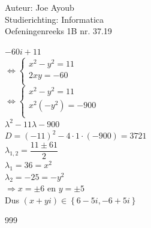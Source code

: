 \documentclass[a4paper]{article}
\newcommand{\lmb}{\lambda}
\begin{document}
  
\noindent \large Auteur: Joe Ayoub \\
\noindent \large Studierichting: Informatica\\
\noindent \large Oefeningenreeks 1B nr. 37.19\\

\medskip

\normalsize

$-60i + 11$\\

$\Leftrightarrow \left\{
	\begin{array}{l} 
		x^2-y^2 = 11 \\
		
		2xy = -60 \\
	\end{array}
\right .$ \\

$\Leftrightarrow \left\{
	\begin{array}{llr} 
		x^2 - y^2 = 11\\
		
		x^{2}(-y^2) = -900 \\
	\end{array}
\right .$ \\

$\lmb^2 - 11\lmb - 900$ \\

$ D = (-11)^2 - 4\cdot1\cdot(-900) = 3721$ \\

$ \lmb_{1,2} = \dfrac{11 \pm 61}{2}$ \\

$ \lmb_{1} = 36 = x^2$ \\

$ \lmb_{2} = -25 = -y^2$ \\

$ \Rightarrow x = \pm 6$ en $ y = \pm 5$ \\

Dus $ (x + yi) \in \left\{6 - 5i, -6 + 5i \right\}$ \\



\begin{thebibliography}{999}

\end{thebibliography}
\end{document}
